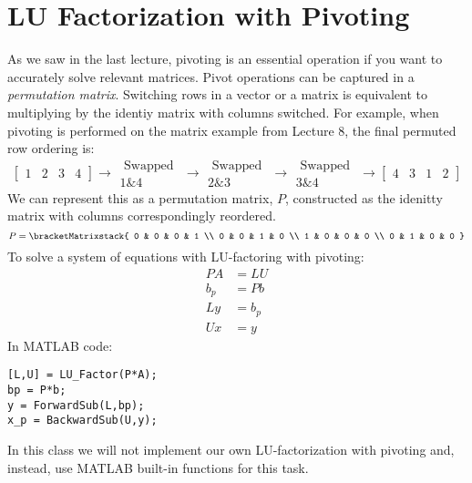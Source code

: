 \section{LU Factorization with Pivoting}
As we saw in the last lecture, pivoting is an essential operation if you want to accurately solve relevant matrices. Pivot operations can be captured in a \emph{permutation matrix}.  Switching rows in a vector or a matrix is equivalent to multiplying by the identiy matrix with columns switched.  For example, when pivoting is performed on the matrix example from Lecture 8, the final permuted row ordering is: 
\begin{equation*}
\left[ \begin{matrix} 1 & 2 & 3 & 4 \end{matrix} \right] \rightarrow \substack{\text{ Swapped } \\ \text{1\&4}} \rightarrow \substack{\text{ Swapped } \\ \text{2\&3}} \rightarrow \substack{\text{ Swapped } \\ \text{3\&4}} \rightarrow \left[\begin{matrix}4 & 3 & 1 & 2 \end{matrix} \right]
\end{equation*}
We can represent this as a permutation matrix, $P$, constructed as the idenitty matrix with columns correspondingly reordered.
\begin{equation*}
P = 
\bracketMatrixstack{
0 & 0 & 0 & 1 \\
0 & 0 & 1 & 0 \\
1 & 0 & 0 & 0 \\
0 & 1 & 0 & 0
}
\end{equation*}
To solve a system of equations with LU-factoring with pivoting:
\begin{align*}
PA &= LU \\
b_p &= Pb \\
Ly &= b_p \\
Ux &= y
\end{align*}
In MATLAB code:
\begin{lstlisting}[style=myMatlab]
[L,U] = LU_Factor(P*A);
bp = P*b;
y = ForwardSub(L,bp);
x_p = BackwardSub(U,y);
\end{lstlisting}
In this class we will not implement our own LU-factorization with pivoting and, instead, use MATLAB built-in functions for this task.
